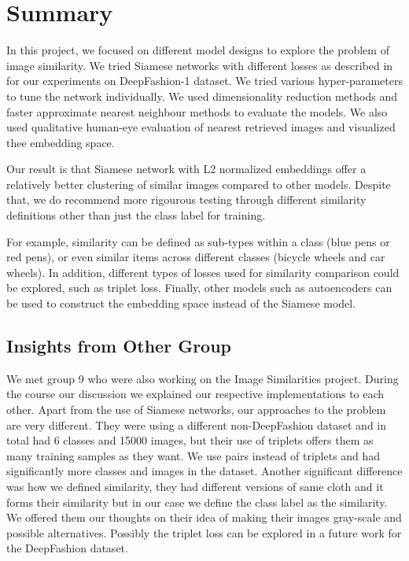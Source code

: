 \documentclass{article}
\begin{document}
\section{Summary}

In this project, we focused on different model designs to explore the problem of image similarity. We tried Siamese networks with different losses as described in \cite{bell2015learning} for our experiments on DeepFashion-1 dataset. We tried various hyper-parameters to tune the network individually. We used dimensionality reduction methods and faster approximate nearest neighbour methods to evaluate the models. We also used qualitative human-eye evaluation of nearest retrieved images and visualized thee embedding space. 

Our result is that Siamese network with L2 normalized embeddings offer a relatively better clustering of similar images compared to other models. Despite that, we do recommend more rigourous testing through different similarity definitions other than just the class label for training. 

For example, similarity can be defined as sub-types within a class (blue pens or red pens), or even similar items across different classes (bicycle wheels and car wheels). In addition, different types of losses used for similarity comparison could be explored, such as triplet loss. Finally, other models such as autoencoders can be used to construct the embedding space instead of the Siamese model.

\subsection{Insights from Other Group}
We met group 9 who were also working on the Image Similarities project. During the course our discussion we explained our respective implementations to each other. Apart from the use of Siamese networks, our approaches to the problem are very different. They were using a different non-DeepFashion dataset and in total had 6 classes and 15000 images, but their use of triplets offers them as many training samples as they want. We use pairs instead of triplets and had significantly more classes and images in the dataset. Another significant difference was how we defined similarity, they had different versions of same cloth and it forms their similarity but in our case we define the class label as the similarity. We offered them our thoughts on their idea of making their images gray-scale and possible alternatives. Possibly the triplet loss can be explored in a future work for the DeepFashion dataset.
\end{document}
